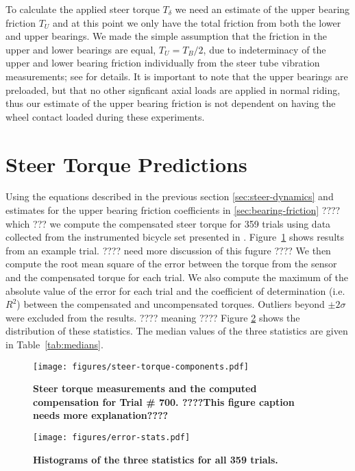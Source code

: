 \documentclass[10pt]{article}
\begin{document}
To calculate the applied steer torque $T_\delta$ we need an estimate of the
upper bearing friction $T_U$ and at this point we only have the total friction
from both the lower and upper bearings. We made the simple assumption that the
friction in the upper and lower bearings are equal, $T_U = T_B / 2$, due to
indeterminacy of the upper and lower bearing friction individually from the
steer tube vibration measurements; see \cite{Moore2012} for details. It is
important to note that the upper bearings are preloaded, but that no other
signficant axial loads are applied in normal riding, thus our estimate of the
upper bearing friction is not dependent on having the wheel contact loaded
during these experiments.


\section*{Steer Torque Predictions}

Using the equations described in the previous section \ref{sec:steer-dynamics} and 
estimates for the upper bearing friction coefficients in
\ref{sec:bearing-friction} ???? which ??? we compute the compensated steer torque for 359
trials using data collected from the instrumented bicycle set presented in
\cite{Moore2012}. Figure~\ref{fig:steer-torque-components} shows results from
an example trial. ???? need more discussion of this fugure ????
We then compute the root mean square of the error between
the torque from the sensor and the compensated torque for each trial. We also
compute the maximum of the absolute value of the error for each trial and the
coefficient of determination (i.e. $R^2$) between the compensated and
uncompensated torques. Outliers beyond $\pm2 \sigma$ were excluded from
the results. ???? meaning ???? Figure \ref{fig:error-stats} shows the distribution of these
statistics. The median values of the three statistics are given in
Table~\ref{tab:medians}.

\begin{figure}
  \centering
  \texttt{[image: figures/steer-torque-components.pdf]}
  \caption{{\bf Steer torque measurements and the computed compensation for Trial \#
    700.  ????This figure caption needs more explanation????}}
  \label{fig:steer-torque-components}
\end{figure}

\begin{figure}
  \centering
  \texttt{[image: figures/error-stats.pdf]}
  \caption{{\bf Histograms of the three statistics for all 359 trials.}}
  \label{fig:error-stats}
\end{figure}
\end{document}
